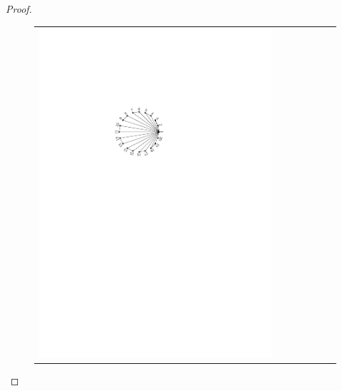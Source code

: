 \documentclass{patmorin}
\begin{document}
\begin{proof}
\begin{figure}
{\begin{tabular}{ccccccc}
       \includegraphics{figs/linear-lower-2} &

\end{tabular}}
\end{figure}
\end{proof}
\end{document}
